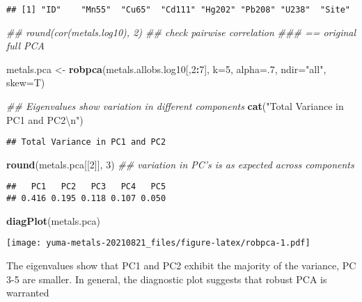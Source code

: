 \documentclass[]{article}
\newenvironment{Shaded}{\begin{snugshade}}{\end{snugshade}}
\newcommand{\CharTok}[1]{\textcolor[rgb]{0.31,0.60,0.02}{#1}}
\newcommand{\CommentTok}[1]{\textcolor[rgb]{0.56,0.35,0.01}{\textit{#1}}}
\newcommand{\DataTypeTok}[1]{\textcolor[rgb]{0.13,0.29,0.53}{#1}}
\newcommand{\DecValTok}[1]{\textcolor[rgb]{0.00,0.00,0.81}{#1}}
\newcommand{\KeywordTok}[1]{\textcolor[rgb]{0.13,0.29,0.53}{\textbf{#1}}}
\newcommand{\NormalTok}[1]{#1}
\newcommand{\OperatorTok}[1]{\textcolor[rgb]{0.81,0.36,0.00}{\textbf{#1}}}
\newcommand{\StringTok}[1]{\textcolor[rgb]{0.31,0.60,0.02}{#1}}
\begin{document}
\begin{verbatim}
## [1] "ID"    "Mn55"  "Cu65"  "Cd111" "Hg202" "Pb208" "U238"  "Site"
\end{verbatim}

\begin{Shaded}
\begin{Highlighting}[]
\CommentTok{## round(cor(metals.log10), 2) ## check pairwise correlation}
\CommentTok{### == original full PCA}

\NormalTok{metals.pca <-}\StringTok{ }\KeywordTok{robpca}\NormalTok{(metals.allobs.log10[,}\DecValTok{2}\OperatorTok{:}\DecValTok{7}\NormalTok{], }\DataTypeTok{k=}\DecValTok{5}\NormalTok{, }\DataTypeTok{alpha=}\NormalTok{.}\DecValTok{7}\NormalTok{, }\DataTypeTok{ndir=}\StringTok{"all"}\NormalTok{, }\DataTypeTok{skew=}\NormalTok{T)}

\CommentTok{## Eigenvalues show variation in different components}
\KeywordTok{cat}\NormalTok{(}\StringTok{"Total Variance in PC1 and PC2}\CharTok{\textbackslash{}n}\StringTok{"}\NormalTok{)}
\end{Highlighting}
\end{Shaded}

\begin{verbatim}
## Total Variance in PC1 and PC2
\end{verbatim}

\begin{Shaded}
\begin{Highlighting}[]
\KeywordTok{round}\NormalTok{(metals.pca[[}\DecValTok{2}\NormalTok{]], }\DecValTok{3}\NormalTok{) }\CommentTok{## variation in PC's is as expected across components}
\end{Highlighting}
\end{Shaded}

\begin{verbatim}
##   PC1   PC2   PC3   PC4   PC5 
## 0.416 0.195 0.118 0.107 0.050
\end{verbatim}

\begin{Shaded}
\begin{Highlighting}[]
\KeywordTok{diagPlot}\NormalTok{(metals.pca)}
\end{Highlighting}
\end{Shaded}

\texttt{[image: yuma-metals-20210821\_files/figure-latex/robpca-1.pdf]}

The eigenvalues show that PC1 and PC2 exhibit the majority of the
variance, PC 3-5 are smaller. In general, the diagnostic plot suggests
that robust PCA is warranted
\end{document}
